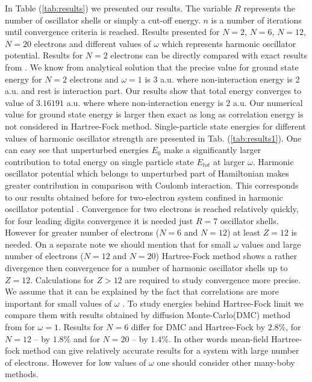 \documentclass[10pt]{article}
\begin{document}
In Table (\ref{tab:results}) we presented our results. The variable $R$ represents the number of oscillator shells or simply a cut-off energy. $n$ is a number of iterations until convergence criteria is reached. Results presented for $N=2$, $N=6$, $N=12$, $N=20$ electrons and different values of $\omega$ which represents harmonic oscillator potential.
Results for $N=2$ electrons can be directly compared with exact results from \cite{Taut}. We know from analytical solution that the precise value for ground state energy for $N=2$ electrons and $\omega=1$ is 3 a.u. where non-interaction energy is 2 a.u. and rest is interaction part. Our results show that total energy converges to value of $3.16191$ a.u. where where non-interaction energy is 2 a.u. Our numerical value for ground state energy is larger then exact as long as correlation energy is not considered in Hartree-Fock method.
Single-particle state energies for different values of harmonic oscillator strength are presented in Tab. (\ref{tab:results1}). One can easy see that unperturbed energies $E_0$ make a significantly larger contribution to total energy on single particle state $E_{tot}$ at larger $\omega$. Harmonic oscillator potential which belongs to unperturbed part of Hamiltonian makes greater contribution in comparison with  Coulomb interaction. This corresponds to our results obtained before for two-electron system confined in harmonic oscillator potential \cite{proj2}.
Convergence for two electrons is reached relatively quickly, for four leading digits convergence it is needed just $R=7$ oscillator shells. However for greater number of electrons  ($N=6$ and $N=12$) at least $Z=12$ is needed. On a separate note we should mention that for small $\omega$ values and large number of electrons ($N=12$ and $N=20$) Hartree-Fock method shows a rather divergence then convergence for a number of harmonic oscillator shells up to $Z=12$. Calculations for $Z > 12$ are required to study convergence more precise. We assume that it can be explained by the fact that correlations are more important for small values of $\omega$ \cite{Hjorth-Jensen}.
To study energies behind Hartree-Fock limit we compare them with results obtained by diffusion Monte-Carlo(DMC) method from \cite{Hjorth-Jensen} for $\omega=1$.
Results for $N=6$ differ for DMC and Hartree-Fock by $2.8\%$, for $N=12$ -- by $1.8\%$ and for $N=20$ -- by $1.4\%$. In other words mean-field Hartree-fock method can give relatively accurate results for a system with large number of electrons. However for low values of $\omega$ one should consider other many-boby methods.  
\end{document}
